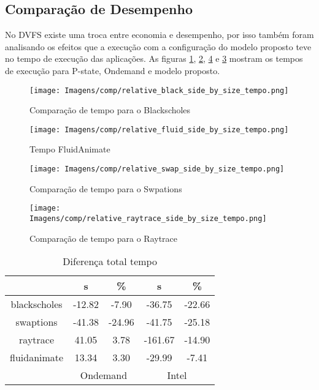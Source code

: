 \subsection{Comparação de Desempenho}

No DVFS existe uma troca entre economia e desempenho, por isso também foram analisando os efeitos que a execução com a configuração do modelo proposto teve no tempo de execução das aplicações. As figuras \ref{fig:tempo_black}, \ref{fig:tempo_fluid}, \ref{fig:tempo_raytrace} e \ref{fig:tempo_swap} mostram os tempos de execução para P-state, Ondemand e modelo proposto.

\begin{figure}[H]
	\centering
	\texttt{[image: Imagens/comp/relative\_black\_side\_by\_size\_tempo.png]}
	\caption{Comparação de tempo para o Blackscholes}
	\label{fig:tempo_black}
\end{figure}%

\begin{figure}[H]
	\centering
	\texttt{[image: Imagens/comp/relative\_fluid\_side\_by\_size\_tempo.png]}
	\caption{Tempo FluidAnimate}
	\label{fig:tempo_fluid}
\end{figure}%

\begin{figure}[H]
	\centering
	\texttt{[image: Imagens/comp/relative\_swap\_side\_by\_size\_tempo.png]}
	\caption{Comparação de tempo para o Swpations}
	\label{fig:tempo_swap}
\end{figure}%

\begin{figure}[H]
	\centering
	\texttt{[image: Imagens/comp/relative\_raytrace\_side\_by\_size\_tempo.png]}
	\caption{Comparação de tempo para o Raytrace}
	\label{fig:tempo_raytrace}
\end{figure}%



\begin{table}[H]
	\label{tab:med_tempo}
	\begin{tabular}{c|c|c|c|c|}
		& s             & \%            & s            & \%          \\ \hline
		\multicolumn{1}{c|}{blackscholes} & -12.82        & -7.90         & -36.75       & -22.66      \\ \hline
		\multicolumn{1}{c|}{swaptions}    & -41.38        & -24.96        & -41.75       & -25.18      \\ \hline
		\multicolumn{1}{c|}{raytrace}     & 41.05         & 3.78          & -161.67      & -14.90      \\ \hline
		\multicolumn{1}{c|}{fluidanimate} & 13.34         & 3.30          & -29.99       & -7.41       \\ \hline
		\multicolumn{1}{l|}{}              & \multicolumn{2}{c|}{Ondemand} & \multicolumn{2}{c|}{Intel} \\ %
	\end{tabular}
	\centering
	\caption{Diferença total tempo}
\end{table}

